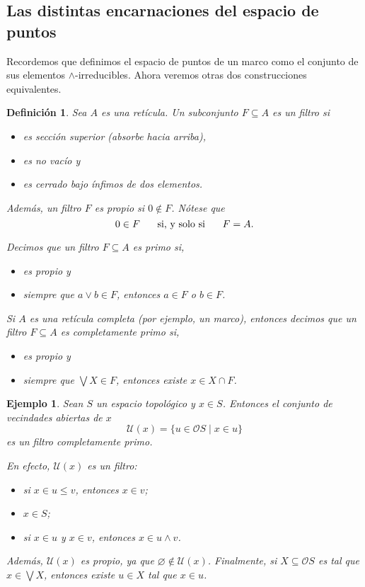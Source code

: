 \documentclass[12pt,letterpaper,titlepage]{article}
\let\emptyset\varnothing
\newtheorem*{defn}{Definición}
\newtheorem*{exa}{Ejemplo}
\theoremstyle{definition}
\renewcommand\sup{\vee}
\newcommand\Sup{\bigvee}
\renewcommand\inf{\wedge}
\renewcommand\cal[1]{\mathcal{#1}}
\newcommand\ssi{\hspace{5mm}\text{ si, y solo si }\hspace{5mm}}
\newcommand\<{\langle}
\renewcommand\>{\rangle}
\begin{document}
\subsection{Las distintas encarnaciones del espacio de puntos}

Recordemos que definimos el espacio de puntos de un marco
como el conjunto de sus elementos $\inf$-irreducibles.
Ahora veremos otras dos construcciones equivalentes.

\begin{defn}
    Sea $A$ es una retícula.
    Un subconjunto $F\subseteq A$ es un filtro si
    \begin{itemize}
        \item es sección superior (absorbe hacia arriba),
        \item es no vacío y
        \item es cerrado bajo ínfimos de dos elementos.
    \end{itemize}
    Además, un filtro $F$ es propio si $0\nin F$.
    Nótese que
    \[
        0\in F \ssi F=A
    .\]
    
    Decimos que un filtro $F\subseteq A$ es primo si,
    \begin{itemize}
        \item es propio y
        \item siempre que $a\sup b\in F$, entonces $a\in F$ o $b\in F$.
    \end{itemize}
    
    Si $A$ es una retícula completa (por ejemplo, un marco),
    entonces decimos que un filtro $F\subseteq A$ es completamente
    primo si,
    \begin{itemize}
        \item es propio y
        \item siempre que $\Sup X\in F$, entonces existe $x\in X\cap F$.
    \end{itemize}
\end{defn}

\begin{exa}
    Sean $S$ un espacio topológico y $x\in S$.
    Entonces el conjunto de vecindades abiertas de $x$
    \[
        \cal U(x) = \{u\in \cal OS\mid x\in u\}
    \]
    es un filtro completamente primo.
    
    En efecto, $\cal U(x)$ es un filtro:
    \begin{itemize}
        \item si $x\in u\leq v$, entonces $x\in v$;
        \item $x\in S$;
        \item si $x\in u$ y $x\in v$, entonces $x\in u\inf v$.
    \end{itemize}
    Además,  $\cal U(x)$ es propio, ya que $\emptyset\nin\cal U(x)$.
    Finalmente, si $X\subseteq \cal OS$ es tal que $x\in \Sup X$,
    entonces existe $u\in X$ tal que $x\in u$.
\end{exa}
\end{document}
